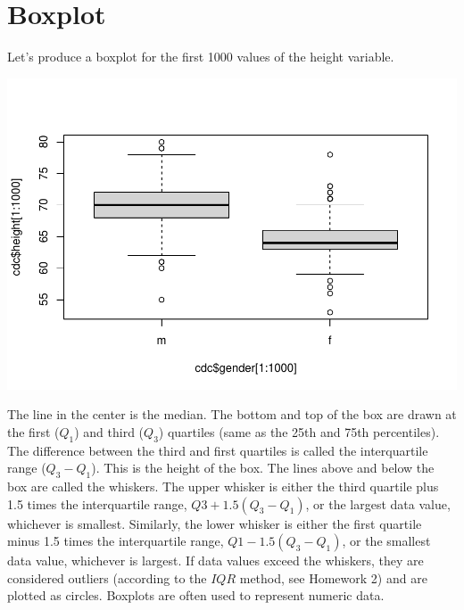 \documentclass[
]{book}
\newenvironment{Shaded}{\begin{snugshade}}{\end{snugshade}}
\newcommand{\DecValTok}[1]{\textcolor[rgb]{0.00,0.00,0.81}{#1}}
\newcommand{\KeywordTok}[1]{\textcolor[rgb]{0.13,0.29,0.53}{\textbf{#1}}}
\newcommand{\NormalTok}[1]{#1}
\newcommand{\OperatorTok}[1]{\textcolor[rgb]{0.81,0.36,0.00}{\textbf{#1}}}
\begin{document}
\hypertarget{boxplot}{%
\section{Boxplot}\label{boxplot}}

Let's produce a boxplot for the first 1000 values of the height variable.

\begin{Shaded}
\end{Shaded}

\includegraphics{_main_files/figure-latex/unnamed-chunk-134-1.pdf}

The line in the center is the median. The bottom and top of the box are drawn at the first (\(Q_1\)) and third (\(Q_3\)) quartiles (same as the 25th and 75th percentiles). The difference between the third and first quartiles is called the interquartile range (\(Q_3-Q_1\)). This is the height of the box. The lines above and below the box are called the whiskers. The upper whisker is either the third quartile plus 1.5 times the interquartile range, \(Q3 +1.5(Q_3-Q_1)\), or the largest data value, whichever is smallest. Similarly, the lower whisker is either the first quartile minus 1.5 times the interquartile range, \(Q1-1.5(Q_3-Q_1)\), or the smallest data value, whichever is largest. If data values exceed the whiskers, they are considered outliers (according to the \(IQR\) method, see Homework 2) and are plotted as circles. Boxplots are often used to represent numeric data.
\end{document}
